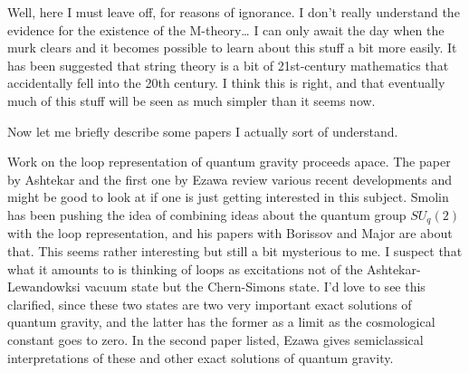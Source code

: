 \documentclass{article}
\renewcommand{\texttt}[1]{%
  \begingroup
  \ttfamily
  \begingroup\lccode`~=`/\lowercase{\endgroup\def~}{/\discretionary{}{}{}}%
  \begingroup\lccode`~=`[\lowercase{\endgroup\def~}{[\discretionary{}{}{}}%
  \begingroup\lccode`~=`.\lowercase{\endgroup\def~}{.\discretionary{}{}{}}%
  \catcode`/=\active\catcode`[=\active\catcode`.=\active
  \scantokens{#1\noexpand}%
  \endgroup
}
\begin{document}
Well, here I must leave off, for reasons of ignorance. I don't really
understand the evidence for the existence of the M-theory\ldots{} I can
only await the day when the murk clears and it becomes possible to learn
about this stuff a bit more easily. It has been suggested that string
theory is a bit of 21st-century mathematics that accidentally fell into
the 20th century. I think this is right, and that eventually much of
this stuff will be seen as much simpler than it seems now.

Now let me briefly describe some papers I actually sort of understand.


Work on the loop representation of quantum gravity proceeds apace. The
paper by Ashtekar and the first one by Ezawa review various recent
developments and might be good to look at if one is just getting
interested in this subject. Smolin has been pushing the idea of
combining ideas about the quantum group \(SU_q(2)\) with the loop
representation, and his papers with Borissov and Major are about that.
This seems rather interesting but still a bit mysterious to me. I
suspect that what it amounts to is thinking of loops as excitations not
of the Ashtekar-Lewandowksi vacuum state but the Chern-Simons state. I'd
love to see this clarified, since these two states are two very
important exact solutions of quantum gravity, and the latter has the
former as a limit as the cosmological constant goes to zero. In the
second paper listed, Ezawa gives semiclassical interpretations of these
and other exact solutions of quantum gravity.
\end{document}

